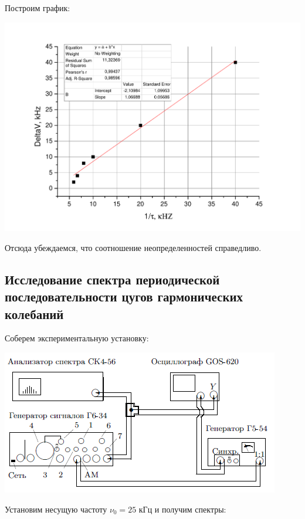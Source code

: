 \documentclass[a4paper,12pt]{article}
\begin{document}
		Построим график:
		
		\includegraphics[width = 0.7\linewidth]{graphA}
		
		Отсюда убеждаемся, что соотношение неопределенностей справедливо.
		
		\subsection{Исследование спектра периодической последовательности цугов гармонических колебаний}
		Соберем экспериментальную установку: 
		
		\includegraphics[width = 0.7\linewidth]{scheme2}
		
		Установим несущую частоту $\nu_0 = 25$ кГц и получим спектры:
		
\end{document}

